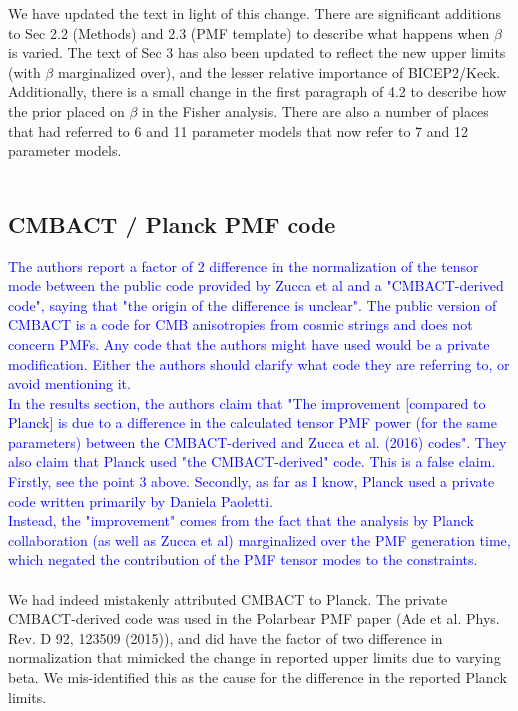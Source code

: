 \documentclass{article}
\newcommand{\reviewer}[1]{\textcolor{Blue}{#1}}
\begin{document}
We have updated the text in light of this change. There are significant additions to Sec 2.2 (Methods) and 2.3 (PMF template) to describe what happens when $\beta$ is varied. The text of Sec 3 has also been updated to reflect the new upper limits (with $\beta$ marginalized over), and the lesser relative importance of BICEP2/Keck.\\

Additionally, there is a small change in the first paragraph of 4.2 to describe how the prior placed on $\beta$ in the Fisher analysis. There are also a number of places that had referred to 6 and 11 parameter models that now refer to 7 and 12 parameter models. \\\\



\subsection{CMBACT / Planck PMF code}
\reviewer{The authors report a factor of 2 difference in the normalization of the tensor mode between the public code provided by Zucca et al and a "CMBACT-derived code", saying that "the origin of the difference is unclear". The public version of CMBACT is a code for CMB anisotropies from cosmic strings and does not concern PMFs. Any code that the authors might have used would be a private modification. Either the authors should clarify what code they are referring to, or avoid mentioning it.\\
In the results section, the authors claim that "The improvement [compared to Planck] is due to a difference in the calculated tensor PMF power (for the same parameters) between the CMBACT-derived and Zucca et al. (2016) codes". They also claim that Planck used "the CMBACT-derived" code. This is a false claim. Firstly, see the point 3 above. Secondly, as far as I know, Planck used a private code written primarily by Daniela Paoletti.\\
Instead, the "improvement" comes from the fact that the analysis by Planck collaboration (as well as Zucca et al) marginalized over the PMF generation time, which negated the contribution of the PMF tensor modes to the constraints.}
\\\\

We had indeed mistakenly attributed CMBACT to Planck. 
The private CMBACT-derived code was used in the Polarbear PMF paper (Ade et al. Phys. Rev. D 92, 123509 (2015)), and did have the factor of two difference in normalization that mimicked the change in reported upper limits due to varying beta. 
We mis-identified this as the cause for the difference in the reported Planck limits.\\
\end{document}
